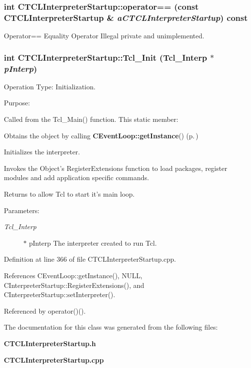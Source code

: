 \subsubsection{\setlength{\rightskip}{0pt plus 5cm}int CTCLInterpreter\-Startup::operator== (const CTCLInterpreter\-Startup \& {\em a\-CTCLInterpreter\-Startup}) const\hspace{0.3cm}{\tt  [private]}}\label{classCTCLInterpreterStartup_c3}


Operator== Equality Operator Illegal private and unimplemented.

\subsubsection{\setlength{\rightskip}{0pt plus 5cm}int CTCLInterpreter\-Startup::Tcl\_\-Init (Tcl\_\-Interp $\ast$ {\em p\-Interp})\hspace{0.3cm}{\tt  [static, protected]}}\label{classCTCLInterpreterStartup_e0}


Operation Type: Initialization.

Purpose:

Called from the Tcl\_\-Main() function. This static member:\begin{CompactItemize}
\item 
Obtains the object by calling {\bf CEvent\-Loop::get\-Instance}() {\rm (p.\,\pageref{classCEventLoop_d0})}\item 
Initializes the interpreter.\item 
Invokes the Object's Register\-Extensions function to load packages, register modules and add application specific commands.\item 
Returns to allow Tcl to start it's main loop.\end{CompactItemize}
\begin{Desc}
\item[Parameters: ]\par
\begin{description}
\item[{\em 
Tcl\_\-Interp}]$\ast$ p\-Interp The interpreter created to run Tcl. \end{description}
\end{Desc}


Definition at line 366 of file CTCLInterpreter\-Startup.cpp.

References CEvent\-Loop::get\-Instance(), NULL, CInterpreter\-Startup::Register\-Extensions(), and CInterpreter\-Startup::set\-Interpreter().

Referenced by operator()().

The documentation for this class was generated from the following files:\begin{CompactItemize}
\item 
{\bf CTCLInterpreter\-Startup.h}\item 
{\bf CTCLInterpreter\-Startup.cpp}\end{CompactItemize}
